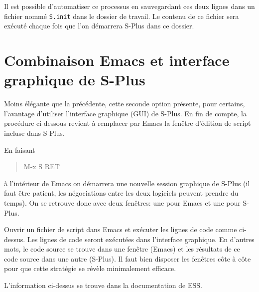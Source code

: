 Il est possible d'automatiser ce processus en sauvegardant ces deux
lignes dans un fichier nommé \texttt{S.init} dans le dossier de
travail. Le contenu de ce fichier sera exécuté chaque fois que l'on
démarrera S-Plus dans ce dossier.


\section[Combinaison Emacs et S-Plus GUI]{Combinaison Emacs et interface graphique de S-Plus}

Moins élégante que la précédente, cette seconde option présente, pour
certains, l'avantage d'utiliser l'interface graphique (GUI) de S-Plus.
En fin de compte, la procédure ci-dessous revient à remplacer par
Emacs la fenêtre d'édition de script incluse dans S-Plus.

En faisant
\begin{quote}
  \ttfamily M-x S RET
\end{quote}
à l'intérieur de Emacs on démarrera une nouvelle session graphique de
S-Plus (il faut être patient, les négociations entre les deux
logiciels peuvent prendre du temps). On se retrouve donc avec deux
fenêtres: une pour Emacs et une pour S-Plus.

Ouvrir un fichier de script dans Emacs et exécuter les lignes de code
comme ci-dessus. Les lignes de code seront exécutées dans l'interface
graphique. En d'autres mots, le code source se trouve dans une fenêtre
(Emacs) et les résultats de ce code source dans une autre (S-Plus). Il
faut bien disposer les fenêtres côte à côte pour que cette stratégie
se révèle minimalement efficace.

L'information ci-dessus se trouve dans la documentation de ESS.


